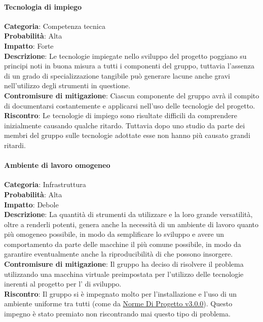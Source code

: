 \documentclass{scalatekids-article}
\begin{document}
\paragraph{Tecnologia di impiego}
\textbf{Categoria}: Competenza tecnica\\
\textbf{Probabilità}: Alta\\
\textbf{Impatto}: Forte\\
\textbf{Descrizione}: Le tecnologie impiegate nello sviluppo del progetto poggiano su principi noti in buona misura a tutti
i componenti del gruppo, tuttavia l'assenza di un grado di specializzazione tangibile può generare lacune anche gravi nell'utilizzo
degli strumenti in questione.\\
\textbf{Contromisure di mitigazione}: Ciascun componente del gruppo avrà il compito di documentarsi costantemente e applicarsi
nell'uso delle tecnologie del progetto.\\
\textbf{Riscontro}: Le tecnologie di impiego sono risultate difficili da comprendere inizialmente causando qualche ritardo.
Tuttavia dopo uno studio da parte dei membri del gruppo sulle tecnologie adottate esse non hanno più causato grandi ritardi.\\
\paragraph{Ambiente di lavoro omogeneo}
\textbf{Categoria}: Infrastruttura\\
\textbf{Probabilità}: Alta\\
\textbf{Impatto}: Debole\\
\textbf{Descrizione}: La quantità di strumenti da utilizzare e la loro grande versatilità, oltre a renderli potenti, genera anche
la necessità di un ambiente di lavoro quanto più omogeneo possibile, in modo da semplificare lo sviluppo e avere un comportamento
da parte delle macchine il più comune possibile, in modo da garantire eventualmente anche la riproducibilità di  che possono
insorgere.\\
\textbf{Contromisure di mitigazione}: Il gruppo ha deciso di risolvere il problema utilizzando una macchina virtuale
preimpostata per l'utilizzo delle tecnologie inerenti al progetto per l' di sviluppo.\\
\textbf{Riscontro}: Il gruppo si è impegnato molto per l'installazione e l'uso di un ambiente uniforme tra tutti (come da \href{run:../Interni/NormeDiProgetto\_v3.0.0.pdf}{Norme Di Progetto v3.0.0}). Questo impegno è stato premiato non riscontrando mai questo tipo di problema.\\
\end{document}
